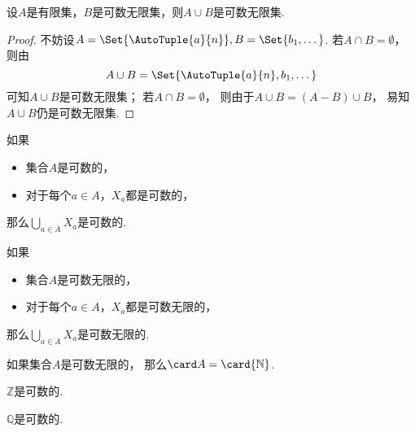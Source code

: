 \begin{example}
设\(A\)是有限集，\(B\)是可数无限集，则\(A \cup B\)是可数无限集.
\begin{proof}
不妨设\(A = \Set{\AutoTuple{a}{n}},
B = \Set{b_1,\dotsc}\).
若\(A \cap B = \emptyset\)，
则由\begin{equation*}
	A \cup B = \Set{\AutoTuple{a}{n},b_1,\dotsc}
\end{equation*}
可知\(A \cup B\)是可数无限集；
若\(A \cap B = \emptyset\)，
则由于\(A \cup B = (A-B) \cup B\)，
易知\(A \cup B\)仍是可数无限集.
\end{proof}
\end{example}

\begin{proposition}
如果\begin{itemize}
	\item 集合\(A\)是可数的，
	\item 对于每个\(a \in A\)，\(X_a\)都是可数的，
\end{itemize}
那么\(\bigcup_{a \in A} X_a\)是可数的.
\end{proposition}

\begin{proposition}
如果\begin{itemize}
	\item 集合\(A\)是可数无限的，
	\item 对于每个\(a \in A\)，\(X_a\)都是可数无限的，
\end{itemize}
那么\(\bigcup_{a \in A} X_a\)是可数无限的.
\end{proposition}

\begin{proposition}
如果集合\(A\)是可数无限的，
那么\(\card A = \card{\mathbb{N}}\).
\end{proposition}

\begin{corollary}
\(\mathbb{Z}\)是可数的.
\end{corollary}

\begin{corollary}
\(\mathbb{Q}\)是可数的.
\end{corollary}


